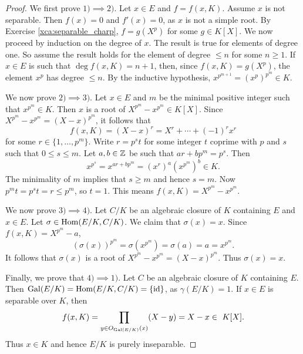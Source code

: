 \begin{proof}
    We first prove $1)\implies 2)$. 
    Let $x\in E$ and $f=f(x,K)$. Assume $x$ is not separable. Then
    $f(x)=0$ and $f'(x)=0$, as $x$ is not a simple root. By Exercise \ref{xca:separable_charp}, 
    $f=g(X^p)$ for some $g\in K[X]$. 
    We now proceed by induction on the degree of $x$. The result
    is true for elements of degree one. So assume the result holds for the element of degree $\leq n$ 
    for some $n\geq1$. 
    If $x\in E$ is such that $\deg f(x,K)=n+1$, then, since $f(x,K)=g(X^p)$, the element 
    $x^p$ has degree $\leq n$. By the inductive hypothesis, $x^{p^{m+1}}=(x^p)^{p^m}\in K$.  

    We now prove $2)\implies 3)$. Let $x\in E$ and $m$ be the minimal positive integer 
    such that $x^{p^m}\in K$. Then
    $x$ is a root of $X^{p^m}-x^{p^m}\in K[X]$. Since 
    $X^{p^m}-x^{p^m}=(X-x)^{p^m}$, it follows that 
    \[
    f(x,K)=(X-x)^r=X^r+\cdots+(-1)^rx^r
    \]
    for some
    $r\in\{1,\dots,p^m\}$. Write $r=p^st$ for some integer $t$ coprime with $p$ and $s$ such that
    $0\leq s\leq m$. Let $a,b\in\mathbb{Z}$ be such that $ar+bp^m=p^s$. Then 
    \[
    x^{p^s}=x^{ar+bp^m}=\left(x^r\right)^a\left(x^{p^m}\right)^b\in K.
    \]
    The minimality of $m$ implies that $s\geq m$ and hence $s=m$. Now $p^mt=p^st=r\leq p^m$, so $t=1$. 
    This means $f(x,K)=X^{p^m}-x^{p^m}$. 
    
    We now prove $3)\implies 4)$. Let $C/K$ be an algebraic closure of $K$ containing $E$ and $x\in E$.  
    Let $\sigma\in\operatorname{Hom}(E/K,C/K)$. We claim that $\sigma(x)=x$. Since 
    $f(x,K)=X^{p^m}-a$, 
    \[
    \left(\sigma(x)\right)^{p^m}=\sigma\left(x^{p^m}\right)=\sigma(a)=a=x^{p^m}.
    \]
    It follows that $\sigma(x)$ is a root of $X^{p^m}-x^{p^m}=(X-x)^{p^m}$. 
    Thus $\sigma(x)=x$. 
    
    Finally, we prove that $4)\implies1)$. Let 
    $C$ be an algebraic closure of $K$ containing $E$. 
    Then $\operatorname{Gal}(E/K)=\operatorname{Hom}(E/K,C/K)=\{\operatorname{id}\}$, as $\gamma(E/K)=1$. 
    If $x\in E$ is separable over $K$, then
    \[
    f(x,K)=\prod_{y\in O_{\operatorname{Gal}(E/K)}(x)}(X-y)=X-x\in\ K[X].
    \]
    Thus $x\in K$ and hence $E/K$ is purely inseparable. 
\end{proof}

